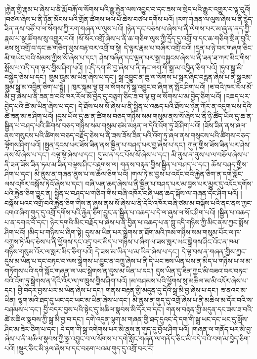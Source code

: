 །རྐྱེན་གྱི་རྣམ་པ་ཞེས་པ་ནི་རྨོ་བརྐོ་ལ་སོགས་པའི་རྒྱུ་རྐྱེན་ལས་འབྱུང་བ་དང་ཟས་ལ་སྲེད་པའི་རྒྱུར་འགྱུར་བ་ལྟ་བུའོ། །བཙལ་ཞེས་པ་ནི་ཉོན་མོངས་པའི་གྲོན་ཚེགས་ཕལ་པོ་ཆེས་བཙལ་དགོས་པའོ། །རག་གཞན་ལ་ལུས་ཞེས་པ་ནི་རྙེད་ཟིན་ནས་བཙོ་བ་ལ་སོགས་ཀྱི་རག་གཞན་ལ་ལུས་པའོ། །ཉེན་དང་བཅས་པ་ཞེས་པ་ནི་ལེགས་པར་མ་ཞུ་ན་ནད་ཀྱི་རྣམ་པ་སྣ་ཚོགས་སུ་འགྱུར་བའོ། །སོ་སོར་འགྲོ་ཞེས་པ་ནི་ཆ་གཅིག་ལུས་ཀྱི་དྲོད་དུ་འགྲོ་བ་དང་ཆ་གཅིག་སྲིན་བུའི་ཟས་སུ་འགྲོ་བ་དང་ཆ་གཅིག་ལུས་བརྟ་བར་འགྲོ་བ་སྟེ། དེ་ལྟར་རྣམ་པ་བཞིར་འགྲོ་བའོ། །དྲན་པ་ཉེ་བར་གཞག་ཅིང་མི་གཡེང་བའི་སེམས་ཀྱིས་སོ་ཞེས་པ་དང་། ཤེས་བཞིན་དང་ལྡན་པར་སྒྲ་བསྐྱུངས་ཞེས་པ་ནི་ཟན་ཟ་ཀར་མིང་གིས་སྨོས་པ་འདི་དག་ལྟར་གྱིས་ཤིག་པའོ། །འདི་དག་མི་བྱ་ཞེས་པ་ནི་རྐང་ལག་གི་སྒྲ་མ་འབྱིན་ཅིག་པའོ། །ཧུབ་སྒྲ་མི་བསྐྱེད་ཅེས་པ་དང་། ཁྲུམ་ཁྲུམ་མ་ཡིན་ཞེས་པ་དང་། སྒྲ་འབྱུང་ན་ཆུ་ལ་སོགས་པ་སྦར་ཞིང་བརླན་ཞེས་པ་ནི་སྒྲའམ་ཁྲུམ་སྒྲ་མ་འབྱིན་ཅིག་པ་སྟེ། །
ཁུར་སྐམ་ལྟ་བུ་ལ་སོགས་ཏེ་སྒྲ་འབྱུང་བ་ཞིག་ན་སྤོང་ཤིག་པའོ། །ཟ་བའི་ཁར་རོལ་མོ་མི་བྱ་ཞེས་པ་ནི་ཟན་ཟ་བའི་ཁར་རོལ་མོ་བྱེད་དུ་བཅུག་ཅིང་ཟ་བ་ལྟ་བུ་ལ་སོགས་པ་མ་བྱེད་ཅིག་པའོ། །འཆད་པར་བྱེད་པའི་ཚེ་མ་ཡིན་ཞེས་པ་དང་། དེ་ཐོས་པས་སོ་ཞེས་པ་ནི་སྦྱིན་པ་འཆད་པའི་ཐོས་པ་ཉེན་ཀོར་ན་འདུག་པས་དེའི་ཚེ་ཟན་མ་ཟ་ཤིག་པའོ། །དུས་ཡོལ་དུ་ཆ་ན་ཚིགས་བཅད་གཉིས་སམ་གསུམ་ནས་སོ་ཞེས་པ་ནི་ཉི་ཚོད་ཡོལ་དུ་ཆ་ན་སྦྱིན་པ་བཤད་པའི་ཚིགས་བཅད་གཉིས་སམ་གསུམ་ཙམ་མཉན་ལ་དེའི་འོག་ཏུ་ཟོ་ཤིག་པའོ། །ཟོས་ཟིན་ནས་ཞལ་ནས་གསུངས་པའི་ཚིགས་བཅད་བརྗོད་ཅེས་པ་ནི་ཟས་ཟོས་ཟིན་པའི་འོག་ཏུ་ཞལ་ནས་གསུངས་པའི་ཚིགས་བཅད་ལྷོགས་ཤིག་པའོ། །སྤྱན་དྲངས་པར་ཟོས་ཟིན་ནས་སྦྱིན་པ་བཤད་པར་བྱ་ཞེས་པ་དང་། ཀུན་གྱིས་ཟོས་ཟིན་པར་ཤེས་ནས་སོ་ཞེས་པ་དང་། བལྟ་སྟེ་ཞེས་པ་དང་། དུ་མ་ན་དང་པོས་སོ་ཞེས་པ་དང་། མི་ནུས་ན་ནུས་པ་ལ་བཅོལ་ཞེས་པ་ནི་ཟན་ཟོས་ཟིན་ཏམ་མ་ཟིན་བལྟས་ཤིང་བརྟགས་ལ། གནས་བརྟན་གྱིས་སྦྱིན་པ་བཤད་པ་དང་། ཆོས་བཤད་གྱིས་ཤིག་པ་དང་། མི་ནུས་ན་གཞན་ནུས་པ་ལ་ཆོལ་ཅིག་པའོ། །གལ་ཏེ་མ་བྱས་པ་འདོང་བའི་རྐྱེན་ཅིག་ན་དགེ་སློང་ལས་འཁོར་བསྐོས་ཏེའོ་ཞེས་པ་དང་། བཞི་ཡན་ཆད་ཞེས་པ་ནི་སྦྱིན་པ་བཤད་པར་མ་བྱས་པར་མྱུར་དུ་འདོང་དགོས་པའི་རྐྱེན་ཅིག་བྱུང་ན། སྦྱིན་པ་བཤད་པ་གཅིག་གིས་བཞི་འཁོར་བཞི་ཡན་ཆད་སྐོས་ལ་གཞན་དེང་ཤིག་པའོ། །བསྐོས་པའང་འགྲོ་བའི་རྐྱེན་ཅིག་གིས་ན་ཞུས་ནས་སོ་ཞེས་པ་ནི་དེའི་འཁོར་བཞི་ཙམ་མ་བསྐོས་པའི་ནང་ནས་ཀྱང་འགའ་ཞིག་གུད་དུ་འགྲོ་དགོས་པའི་རྐྱེན་ཅིག་བྱུང་ན་སྦྱིན་པ་འཆད་པ་དེ་ལ་ཞུས་ལ་སོང་ཤིག་པའོ། །སྦྱིན་པ་འཆད་པ་ན་དགའ་བོ་དང་། ཉེར་དགའི་མིང་བརྗོད་པ་ཞེས་པ་ནི་བྱིན་པ་འཆད་པ་ན་ཀླུ་འདི་གཉིས་ཀྱི་མིང་ནས་ཀྱང་སྨོས་ཤིག་པའོ། །མིད་པ་གཉིས་པ་ཞིག་སྟེ། དུས་མ་ཡིན་པར་སྒྲེགས་ན་ཐོག་མའི་ཁམ་གཉིས་སམ་གསུམ་པོར་ལ་ཁ་བཀྲུས་ཏེ་མིད་ཅེས་པ་ནི་ཕྱོགས་དང་འདྲ་བར་མིད་པ་གཉིས་པ་ཞིག་ལ་ཟས་སླར་ཡང་སྒྲེགས་ཤིང་འོང་ན་ཁམ་གཉིས་གསུམ་འོར་ལ་སླར་མིད་ཅིག་པའོ། དེ་ཟས་མ་ཡིན་པ་མ་ཡིན་ཞེས་པ་དང་། དེ་ལྟ་བས་ན་གཞན་གྱིས་ཀྱང་དུས་མ་ཡིན་པ་དང་བཏང་བ་ལས་སྒྲེགས་པ་བྱུང་ན་བཀྲུ་ཞེས་པ་ནི་དེ་ཡང་ཟས་ཡིན་པས་ན་མིད་པ་གཉིས་པ་ལ་མ་གཏོགས་པའི་དགེ་སློང་གཞན་ལ་ཡང་སྒྲེགས་ན་དུས་མ་ཡིན་པ་དང་། དུས་ཡིན་དུ་ཟིན་ཀྱང་མི་བཟའ་བར་བཏང་བའི་འོག་ཏུ་སྒྲེགས་ན་དེའི་འོར་ལ་ཁ་ཁྲུས་གྱིས་ཤིག་པའོ། །མ་བཤམས་པའི་ཕྱོགས་སུ་མཆིལ་མ་མི་འདོར་ཞེས་པ་དང་། བྱི་བདར་བྱས་པར་མ་ཡིན་ཞེས་པ་དང་། གནས་བརྟན་གྱི་མདུན་དུ་དེའི་སྒྲ་མི་བྱ་ཞེས་པ་དང་། ཟ་ནའང་མ་ཡིན། ལྷག་མའི་ཐད་དུ་ཡང་དང་ཡང་མ་ཡིན་ཞེས་པ་དང་། མི་ནུས་ན་གུད་དུ་འགྲོ་ཞེས་པ་ནི་མཆིལ་མ་དོར་བའི་ས་བཤམས་པ་དང་། བྱི་བདར་བྱས་པའི་སྟེང་དུ་མཆིལ་སྣབས་མི་དོར་བ་དང་། གནས་བརྟན་གྱི་མདུན་དང་ཟས་ཟ་བའི་ཚེ་མཆིལ་སྣབས་ཀྱི་སྒྲ་མི་བྱ་བ་དང་། དགེ་འདུན་ལྷག་མ་གཞན་གྱི་ཐད་དུའང་དེ་དག་གི་སྒྲ་ཡང་དང་ཡང་དུ་སློས་ཤིང་མ་ཟེར་ཅིག་པ་དང་། དེ་དག་གི་སྒྲ་འགེགས་པར་མི་ནུས་ན་གུད་དུ་བྱོལ་ཤིག་པའོ། །གཞན་ལ་གནོད་པར་མི་བྱ་ཞེས་པ་ནི་མཆིལ་སྣབས་ཀྱི་སྒྲ་འབྱུང་བ་ལ་སོགས་པ་དགེ་སློང་གཞན་ལ་གནོད་ཅིང་མི་བདེ་བའི་བག་མ་བྱེད་ཅིག་པའོ། །སྡུར་ཅིང་མི་ཉལ་ཞེས་པ་དང་བཅག་པའམ་གུད་དུ་འགྲོ་བར་རོ། 